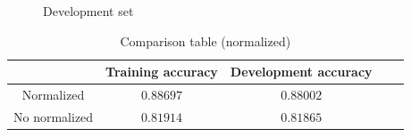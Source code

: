 \documentclass[a4paper,11pt]{article}
\begin{document}
\begin{enumerate}
	\begin{figure}[htp]
	    \begin{center}
	    	\quad
	    	\caption{Development set}
	    \end{center}
	\end{figure}

	\begin{table}[htp]
		\begin{center}
			\begin{tabular}{ | c | c | c | c | c |}
			  	\hline
		  		& Training accuracy & Development accuracy\\[0.5ex] 
		  		\hline \hline
		  		Normalized & $0.88697$ & $0.88002$ \\[0.2ex]
		  		\hline
		  		No normalized & $0.81914$ & $0.81865$\\[0.2ex]
		  		\hline
			\end{tabular}
			\caption{Comparison table (normalized)}
		\end{center}
	\end{table}

\end{enumerate}
\end{document}
